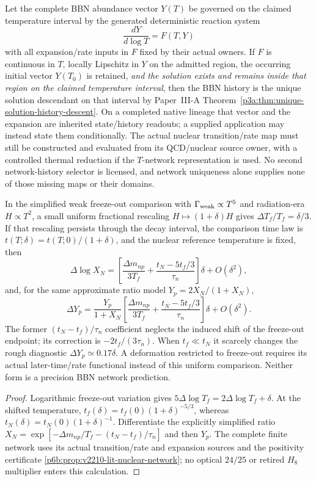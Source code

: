 \documentclass[12pt,a4paper]{article}
\begin{document}
\begin{corollary}
\label{p9:cor:bbn-network-history-descendant}
Let the complete BBN abundance vector $Y(T)$ be governed on the claimed
temperature interval by the generated deterministic reaction system
\[
 \frac{dY}{d\log T}=F(T,Y)
\]
with all expansion/rate inputs in $F$ fixed by their actual owners. If $F$ is
continuous in $T$, locally Lipschitz in $Y$ on the admitted region, the
occurring initial vector $Y(T_0)$ is retained, \emph{and the solution exists
and remains inside that region on the claimed temperature interval}, then
the BBN history is the unique solution descendant on that interval by
Paper~III-A Theorem~\ref{p3a:thm:unique-solution-history-descent}.  On a completed
native lineage that vector and the expansion are inherited state/history
readouts; a supplied application may instead state them conditionally.  The
actual nuclear transition/rate map must still be constructed and evaluated
from its QCD/nuclear source owner, with a controlled thermal reduction if the
$T$-network representation is used.  No second network-history selector is
licensed, and network uniqueness alone supplies none of those missing maps
or their domains.
\end{corollary}

\begin{lemma}
\label{p9:lem:first-order-bbn-freezeout}
In the simplified weak freeze-out comparison with
$\Gamma_{\rm weak}\propto T^5$ and radiation-era $H\propto T^2$,
a small uniform fractional rescaling $H\mapsto(1+\delta)H$ gives
$\Delta T_f/T_f=\delta/3$. If that rescaling persists through the
decay interval, the comparison time law is
$t(T;\delta)=t(T;0)/(1+\delta)$, and the nuclear reference temperature
is fixed, then
\[
 \Delta\log X_N=
 \left[\frac{\Delta m_{np}}{3T_f}
       +\frac{t_N-5t_f/3}{\tau_n}\right]\delta+O(\delta^2),
\]
and, for the same approximate ratio model
$Y_p=2X_N/(1+X_N)$,
\[
 \Delta Y_p=\frac{Y_p}{1+X_N}
 \left[\frac{\Delta m_{np}}{3T_f}
       +\frac{t_N-5t_f/3}{\tau_n}\right]\delta+O(\delta^2).
\]
The former $(t_N-t_f)/\tau_n$ coefficient neglects the induced shift
of the freeze-out endpoint; its correction is $-2t_f/(3\tau_n)$.
When $t_f\ll t_N$ it scarcely changes the rough diagnostic
$\Delta Y_p\simeq0.17\delta$. A deformation restricted to freeze-out
requires its actual later-time/rate functional instead of this uniform
comparison. Neither form is a precision BBN network prediction.
\end{lemma}
\begin{proof}
Logarithmic freeze-out variation gives $5\Delta\log T_f=
2\Delta\log T_f+\delta$. At the shifted temperature,
$t_f(\delta)=t_f(0)(1+\delta)^{-5/3}$, whereas
$t_N(\delta)=t_N(0)(1+\delta)^{-1}$. Differentiate the explicitly
simplified ratio $X_N=\exp[-\Delta m_{np}/T_f-
(t_N-t_f)/\tau_n]$ and then $Y_p$. The complete finite network
uses its actual transition/rate and expansion sources and the positivity
certificate \ref{p6b:prop:v2210-lit-nuclear-network}; no optical
$24/25$ or retired $H_8$ multiplier enters this calculation.
\end{proof}
\end{document}
